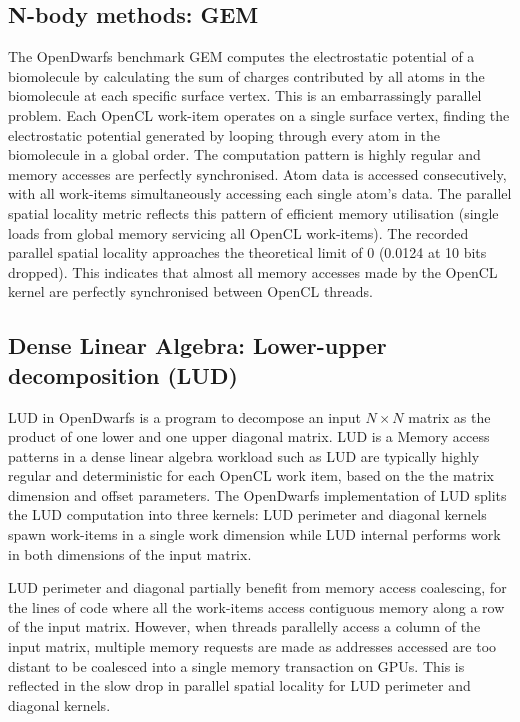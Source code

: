\documentclass[review=false, sigchi]{acmart}
\begin{document}
	\subsection{N-body methods: GEM}
	
	The OpenDwarfs benchmark GEM computes the electrostatic potential of a biomolecule by calculating the sum of charges contributed by all atoms in the biomolecule at each specific surface vertex.
	This is an embarrassingly parallel problem. Each OpenCL work-item operates on a single surface vertex, finding the electrostatic potential generated by looping through every atom in the biomolecule in a global order. 
	The computation pattern is highly regular and memory accesses are perfectly synchronised. Atom data is accessed consecutively, with all work-items simultaneously accessing each single atom's data.
	The parallel spatial locality metric reflects this pattern of efficient memory utilisation (single loads from global memory servicing all OpenCL work-items). The recorded parallel spatial locality approaches the theoretical limit of 0 (0.0124 at 10 bits dropped). This indicates that almost all memory accesses made by the OpenCL kernel are perfectly synchronised between OpenCL threads.
	
	\subsection{Dense Linear Algebra: Lower-upper decomposition (LUD)}
	
	LUD in OpenDwarfs is a program to decompose an input $N\times N$ matrix as the product of one lower and one upper diagonal matrix. LUD is a Memory access patterns in a dense linear algebra workload such as LUD are typically highly regular and deterministic for each OpenCL work item, based on the the matrix dimension and offset parameters. The OpenDwarfs implementation of LUD \cite{opendwarfs2017base} splits the LUD computation into three kernels: LUD perimeter and diagonal kernels spawn work-items in a single work dimension while LUD internal performs work in both dimensions of the input matrix.
	
	LUD perimeter and diagonal partially benefit from memory access coalescing, for the lines of code where all the work-items access contiguous memory along a row of the input matrix. However, when threads parallelly access a column of the input matrix, multiple memory requests are made as addresses accessed are too distant to be coalesced into a single memory transaction on GPUs. This is reflected in the slow drop in parallel spatial locality for LUD perimeter and diagonal kernels.
	
\end{document}
